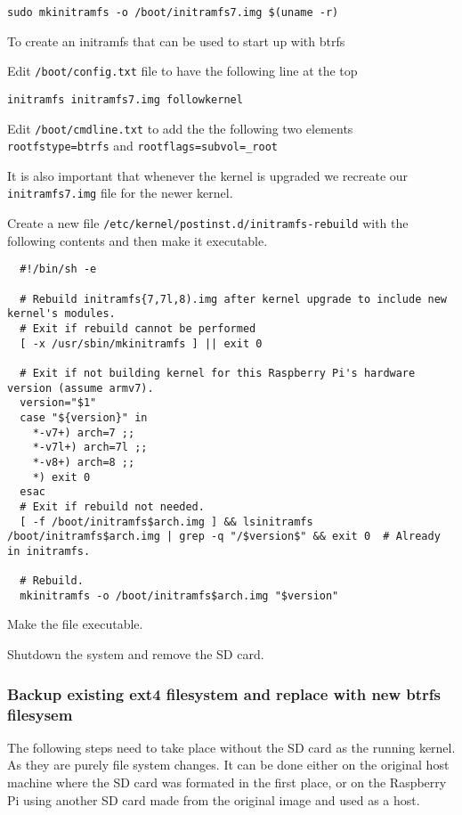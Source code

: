 \documentclass[Draft]{akc}
\begin{document}
\begin{lstlisting}
sudo mkinitramfs -o /boot/initramfs7.img $(uname -r)
\end{lstlisting}

To create an initramfs that can be used to start up with btrfs

Edit \texttt{/boot/config.txt} file to have the following line at the top

\begin{lstlisting}
initramfs initramfs7.img followkernel
\end{lstlisting}

Edit \texttt{/boot/cmdline.txt} to add the the following two elements \texttt{rootfstype=btrfs} and
\texttt{rootflags=subvol=\_root}

It is also important that whenever the kernel is upgraded we recreate our \texttt{initramfs7.img}
file for the newer kernel.

Create a new file \texttt{/etc/kernel/postinst.d/initramfs-rebuild} with the following contents and
then make it executable.

\begin{lstlisting}
  #!/bin/sh -e

  # Rebuild initramfs{7,7l,8).img after kernel upgrade to include new kernel's modules.
  # Exit if rebuild cannot be performed
  [ -x /usr/sbin/mkinitramfs ] || exit 0

  # Exit if not building kernel for this Raspberry Pi's hardware version (assume armv7).
  version="$1"
  case "${version}" in
    *-v7+) arch=7 ;;
    *-v7l+) arch=7l ;;
    *-v8+) arch=8 ;;
    *) exit 0
  esac
  # Exit if rebuild not needed.
  [ -f /boot/initramfs$arch.img ] && lsinitramfs /boot/initramfs$arch.img | grep -q "/$version$" && exit 0  # Already in initramfs.

  # Rebuild.
  mkinitramfs -o /boot/initramfs$arch.img "$version"
\end{lstlisting}

Make the file executable.

Shutdown the system and remove the SD card.
\subsubsection{Backup existing ext4 filesystem and replace with new btrfs filesysem}

The following steps need to take place without the SD card as the running kernel. As they are purely
file system changes.  It can be done either on the original host machine where the SD card was
formated in the first place, or on the Raspberry Pi using another SD card made from the original
image and used as a host.
\end{document}
